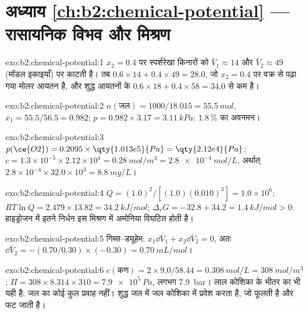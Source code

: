 \section*{अध्याय \ref{ch:b2:chemical-potential} --- रासायनिक विभव और मिश्रण}

\begin{solution}{exo:b2:chemical-potential:1}
$x_2 = 0.4$ पर स्पर्शरेखा किनारों को $\bar V_1 \approx 14$ और $\bar
V_2 \approx 49$ (मॉडल इकाइयाँ) पर काटती है। तब $0.6 \times 14 + 0.4 \times 49 = 28.0$,
जो $x_2 = 0.4$ पर वक्र से पढ़ा गया मोलर आयतन है, और शुद्ध आयतनों के
$0.6 \times 18 + 0.4 \times 58 = 34.0$ से कम है।
\end{solution}

\begin{solution}{exo:b2:chemical-potential:2}
$n(\text{जल}) = 1000/18.015 = \qty{55.5}{mol}$, $x_1 = 55.5/56.5 = 0.982$;
$p = 0.982 \times 3.17 = \qty{3.11}{kPa}$: 1.8\,\% का अवनमन।
\end{solution}

\begin{solution}{exo:b2:chemical-potential:3}
$p(\ce{O2}) = 0.2095 \times \qty{1.013e5}{Pa} = \qty{2.12e4}{Pa}$;
$c = 1.3 \times 10^{-5} \times 2.12 \times 10^4 = \qty{0.28}{mol/m^3} =
\qty{2.8e-4}{mol/L}$, अर्थात् $2.8 \times 10^{-4} \times 32.0 \times 10^3 =
\qty{8.8}{mg/L}$।
\end{solution}

\begin{solution}{exo:b2:chemical-potential:4}
$Q = (1.0)^2/[(1.0)(0.010)^3] = 1.0 \times 10^6$; $RT\ln Q = 2.479 \times 13.82 =
\qty{34.2}{kJ/mol}$; $\Delta_r G = -32.8 + 34.2 = \qty{+1.4}{kJ/mol} > 0$: हाइड्रोजन में
इतने निर्धन इस मिश्रण में अमोनिया विघटित होती है।
\end{solution}

\begin{solution}{exo:b2:chemical-potential:5}
गिब्स--ड्यूहेम: $x_1\dd\bar V_1 + x_2\dd\bar V_2 = 0$, अतः $\dd\bar V_2 =
-(0.70/0.30) \times (-0.30) = \qty{+0.70}{mL/mol}$।
\end{solution}

\begin{solution}{exo:b2:chemical-potential:6}
$c(\text{कण}) = 2 \times 9.0/58.44 = \qty{0.308}{mol/L} =
\qty{308}{mol/m^3}$; $\Pi = 308 \times 8.314 \times 310 = \qty{7.9e5}{Pa}$,
लगभग \qty{7.9}{bar}। लाल कोशिका के भीतर का  भी यही है:
जल का कोई कुल प्रवाह नहीं। शुद्ध जल में जल कोशिका में प्रवेश करता है, जो फूलती है और
फट जाती है।
\end{solution}


